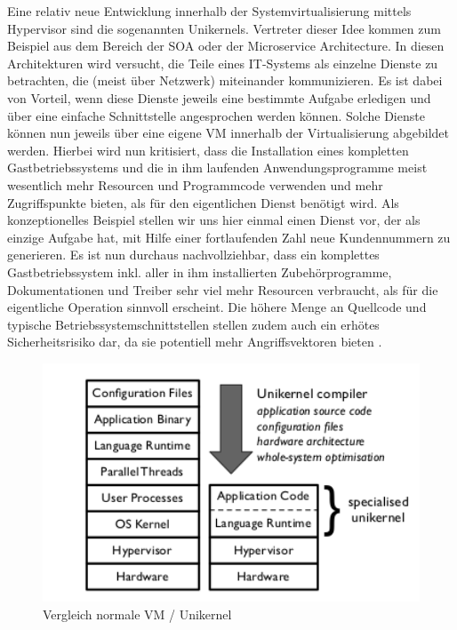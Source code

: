 Eine relativ neue Entwicklung innerhalb der Systemvirtualisierung mittels Hypervisor sind die sogenannten Unikernels. Vertreter dieser Idee kommen zum Beispiel aus dem Bereich der \ac{SOA} oder der Microservice Architecture. In diesen Architekturen wird versucht, die Teile eines IT-Systems als einzelne Dienste zu betrachten, die (meist über Netzwerk) miteinander kommunizieren. Es ist dabei von Vorteil, wenn diese Dienste jeweils eine bestimmte Aufgabe erledigen und über eine einfache Schnittstelle angesprochen werden können. Solche Dienste können nun jeweils über eine eigene \ac{VM} innerhalb der Virtualisierung abgebildet werden. Hierbei wird nun kritisiert, dass die Installation eines kompletten Gastbetriebssystems und die in ihm laufenden Anwendungsprogramme meist wesentlich mehr Resourcen und Programmcode verwenden und mehr Zugriffspunkte bieten, als für den eigentlichen Dienst benötigt wird. Als konzeptionelles Beispiel stellen wir uns hier einmal einen Dienst vor, der als einzige Aufgabe hat, mit Hilfe einer fortlaufenden Zahl neue Kundennummern zu generieren. Es ist nun durchaus nachvollziehbar, dass ein komplettes Gastbetriebssystem inkl. aller in ihm installierten Zubehörprogramme, Dokumentationen und Treiber sehr viel mehr Resourcen verbraucht, als für die eigentliche Operation sinnvoll erscheint. Die höhere Menge an Quellcode und typische Betriebssystemschnittstellen stellen zudem auch ein erhötes Sicherheitsrisiko dar, da sie potentiell mehr Angriffsvektoren bieten \citep[Vgl.][Abstract und Introduction]{MadMorAnd13}.

\begin{figure}[!ht]
  \begin{center}
    \includegraphics[width=12cm]{bilder/comparison-vm-unikernel.png}
    \caption{Vergleich normale VM / Unikernel \citep[Abb. 1]{MadMorAnd13}}
  \end{center}
\end{figure}

